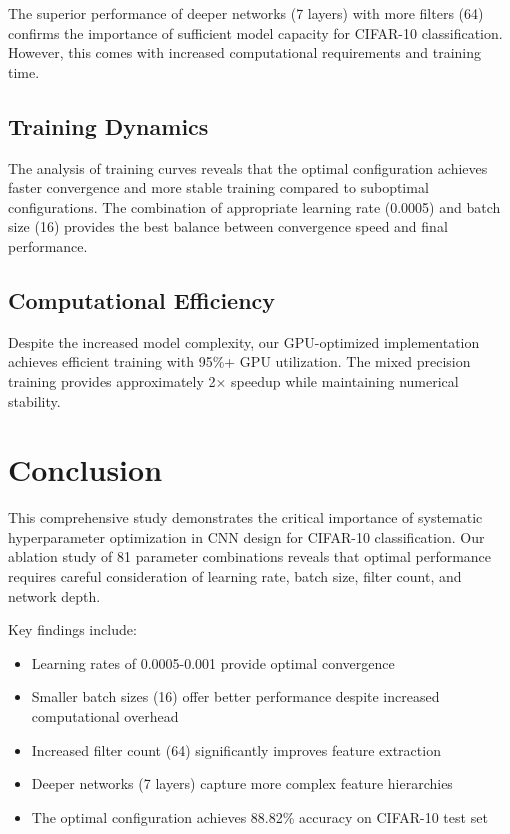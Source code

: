 \documentclass[norunningheads]{llncs}
\begin{document}
The superior performance of deeper networks (7 layers) with more filters (64) confirms the importance of sufficient model capacity for CIFAR-10 classification. However, this comes with increased computational requirements and training time.

\subsection{Training Dynamics}

The analysis of training curves reveals that the optimal configuration achieves faster convergence and more stable training compared to suboptimal configurations. The combination of appropriate learning rate (0.0005) and batch size (16) provides the best balance between convergence speed and final performance.

\subsection{Computational Efficiency}

Despite the increased model complexity, our GPU-optimized implementation achieves efficient training with 95\%+ GPU utilization. The mixed precision training provides approximately 2× speedup while maintaining numerical stability.

\section{Conclusion}

This comprehensive study demonstrates the critical importance of systematic hyperparameter optimization in CNN design for CIFAR-10 classification. Our ablation study of 81 parameter combinations reveals that optimal performance requires careful consideration of learning rate, batch size, filter count, and network depth.

Key findings include:
\begin{itemize}
\item Learning rates of 0.0005-0.001 provide optimal convergence
\item Smaller batch sizes (16) offer better performance despite increased computational overhead
\item Increased filter count (64) significantly improves feature extraction
\item Deeper networks (7 layers) capture more complex feature hierarchies
\item The optimal configuration achieves 88.82\% accuracy on CIFAR-10 test set
\end{itemize}
\end{document}
